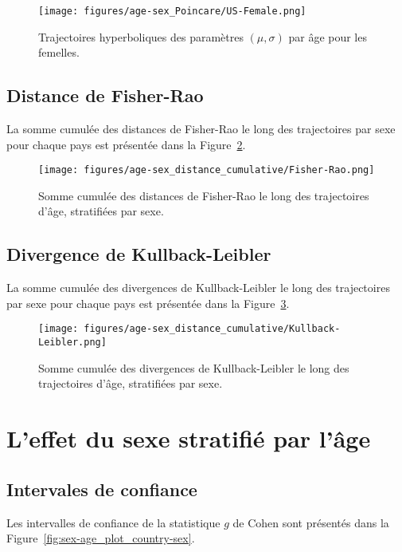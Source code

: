 \begin{figure}[H]
	\centering
	\texttt{[image: figures/age-sex\_Poincare/US-Female.png]}
	\caption{Trajectoires hyperboliques des paramètres \((\mu, \sigma)\) par âge pour les femelles.}
	\label{fig:age-sex_Poincare_female}
\end{figure}

\subsection{Distance de Fisher-Rao}

La somme cumulée des distances de Fisher-Rao le long des trajectoires par sexe pour chaque pays est présentée dans la Figure~\ref{fig:age-sex_FR_cumulative}.

\begin{figure}[H]
	\centering
	\texttt{[image: figures/age-sex\_distance\_cumulative/Fisher-Rao.png]}
	\caption{Somme cumulée des distances de Fisher-Rao le long des trajectoires d'âge, stratifiées par sexe.}
	\label{fig:age-sex_FR_cumulative}
\end{figure}

\subsection{Divergence de Kullback-Leibler}

La somme cumulée des divergences de Kullback-Leibler le long des trajectoires par sexe pour chaque pays est présentée dans la Figure~\ref{fig:age-sex_KL_cumulative}.

\begin{figure}[H]
	\centering
	\texttt{[image: figures/age-sex\_distance\_cumulative/Kullback-Leibler.png]}
	\caption{Somme cumulée des divergences de Kullback-Leibler le long des trajectoires d'âge, stratifiées par sexe.}
	\label{fig:age-sex_KL_cumulative}
\end{figure}

\section{L'effet du sexe stratifié par l'âge}

\subsection{Intervales de confiance}

Les intervalles de confiance de la statistique \(g\) de Cohen sont présentés dans la Figure~\ref{fig:sex-age_plot_country-sex}.

